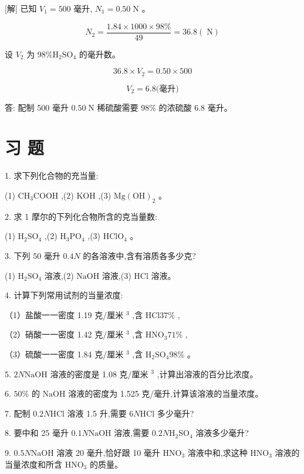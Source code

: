 \documentclass[10pt]{article}
\begin{document}
[解] 已知 \({V}_{1} = {500}\) 毫升, \({N}_{1} = {0.50}\mathrm{\;N}\) 。

\[
{N}_{2} = \frac{{1.84} \times {1000} \times {98}\% }{49} = {36.8}\left( \mathrm{\;N}\right)
\]

设 \({V}_{2}\) 为 \({98}\% {\mathrm{H}}_{2}{\mathrm{{SO}}}_{4}\) 的毫升数。

\[
{36.8} \times {V}_{2} = {0.50} \times {500}
\]

\[
{V}_{2} = {6.8}\text{(毫升)}
\]

答: 配制 500 毫升 \({0.50}\mathrm{\;N}\) 稀硫酸需要 \({98}\%\) 的浓硫酸 6.8 毫升。

\section*{习 题}

1. 求下列化合物的充当量:

(1) \({\mathrm{{CH}}}_{3}\mathrm{{COOH}}\) ,(2) \(\mathrm{{KOH}}\) ,(3) \(\mathrm{{Mg}}{\left( \mathrm{{OH}}\right) }_{2}\) 。

2. 求 1 摩尔的下列化合物所含的克当量数:

(1) \({\mathrm{H}}_{2}{\mathrm{{SO}}}_{4}\) ,(2) \({\mathrm{H}}_{3}{\mathrm{{PO}}}_{4}\) ,(3) \({\mathrm{{HClO}}}_{4}\) 。

3. 下列 50 毫升 \({0.4N}\) 的各溶液中,含有溶质各多少克?

(1) \({\mathrm{H}}_{2}{\mathrm{{SO}}}_{4}\) 溶液,(2) \(\mathrm{{NaOH}}\) 溶液,(3) \(\mathrm{{HCl}}\) 溶液。

4. 计算下列常用试剂的当量浓度:

（1）盐酸一一密度 1.19 克/厘米 \({}^{3}\) ,含 \(\mathrm{{HCl}}{37}\%\) ,

（2）硝酸一一密度 1.42 克/厘米 \({}^{3}\) ,含 \({\mathrm{{HNO}}}_{3}{71}\%\) ,

（3）硫酸一一密度 1.84 克/厘米 \({}^{3}\) ,含 \({\mathrm{H}}_{2}{\mathrm{{SO}}}_{4}{98}\%\) 。

5. \({2N}\mathrm{{NaOH}}\) 溶液的密度是 1.08 克/厘米 \({}^{3}\) ,计算出溶液的百分比浓度。

6. \({50}\%\) 的 \(\mathrm{{NaOH}}\) 溶液的密度为 1.525 克/毫升,计算该溶液的当量浓度。

7. 配制 \({0.2N}\mathrm{{HCl}}\) 溶液 1.5 升,需要 \({6N}\mathrm{{HCl}}\) 多少毫升?

8. 要中和 25 毫升 \({0.1N}\mathrm{{NaOH}}\) 溶液,需要 \({0.2N}{\mathrm{H}}_{2}{\mathrm{{SO}}}_{4}\) 溶液多少毫升?

9. \({0.5N}\mathrm{{NaOH}}\) 溶液 20 毫升,恰好跟 10 毫升 \({\mathrm{{HNO}}}_{3}\) 溶液中和,求这种 \({\mathrm{{HNO}}}_{3}\) 溶液的当量浓度和所含 \({\mathrm{{HNO}}}_{3}\) 的质量。
\end{document}
